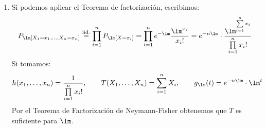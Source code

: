 \begin{ejercicio}
\begin{enumerate}[label=\alph*)]
        \item Si podemos aplicar el Teorema de factorización, escribimos:
            \begin{equation*}
                P_\lm[X_1=x_1, \ldots, X_n = x_n] \stackrel{\text{iid.}}{=} \prod_{i=1}^{n} P_\lm[X=x_i] = \prod_{i=1}^{n}e^{-\lm}\dfrac{\lm^{x_i}}{x_i!} = e^{-n\lm} \cdot \dfrac{\lm^{\sum\limits_{i=1}^{n} x_i}}{\prod\limits_{i=1}^{n}x_i!}
            \end{equation*}
            Si tomamos:
            \begin{equation*}
                h(x_1, \ldots, x_n) = \dfrac{1}{\prod\limits_{i=1}^{n}x_i!}, \qquad T(X_1, \ldots, X_n) = \sum_{i=1}^{n}X_i, \qquad g_\lm(t) = e^{-n\lm} \cdot \lm^t
            \end{equation*}
            Por el Teorema de Factorización de Neymann-Fisher obtenemos que $T$ es suficiente para $\lm$.
    \end{enumerate}
\end{ejercicio}

